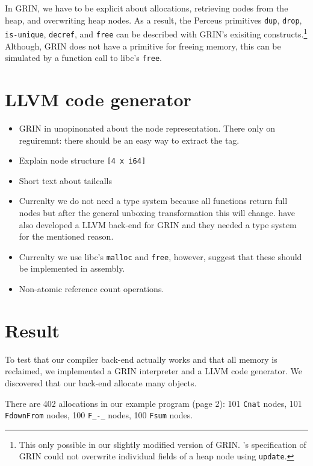 \documentclass[10pt, twocolumn]{article}
\begin{document}
In GRIN, we have to be explicit about allocations, retrieving nodes from the heap, and overwriting heap nodes.
As a result, the Perceus primitives \texttt{dup}, \texttt{drop}, \texttt{is-unique}, \texttt{decref}, and \texttt{free} 
can be described with GRIN's exisiting constructs.\footnote{This only possible in our slightly modified version of 
GRIN. \citeauthor{boquist1999}'s specification of GRIN could not overwrite individual fields of a heap node 
using \texttt{update}.}
Although, GRIN does not have a primitive for freeing memory, this can be simulated by a function call 
to libc's \texttt{free}.
 

\section{LLVM code generator}
\begin{itemize}
\item GRIN in unopinonated about the node representation. There only on reguiremnt: there should be 
      an easy way to extract the tag.
\item Explain node structure \texttt{[4 x i64]}
\item Short text about tailcalls
\item Currenlty we do not need a type system because all functions 
      return full nodes but after the general unboxing transformation 
      this will change. \citet{podlovics2021} have also developed a 
      LLVM back-end for GRIN and they needed a type system for the mentioned 
      reason.
\item Currenlty we use libc's \texttt{malloc} and \texttt{free}, however, \citeauthor{pinto2023} suggest that these should be implemented in assembly.
\item Non-atomic reference count operations.
\end{itemize}

\section{Result}

To test that our compiler back-end actually works and that all memory is reclaimed, we implemented a GRIN interpreter and a LLVM code generator.
We discovered that our back-end allocate many objects. 

There are 402 allocations in our example program (page 2): 
101 \texttt{Cnat} nodes, 101 \texttt{FdownFrom} nodes, 100 \texttt{F\_-\_} nodes, 100 \texttt{Fsum} nodes.
\end{document}

